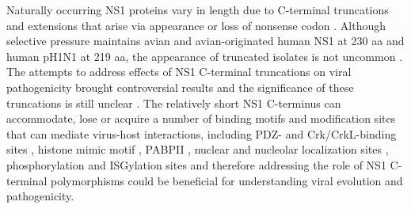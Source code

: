 		Naturally occurring \gls{NS1} proteins vary in length due to C-terminal truncations and extensions that arise via appearance or loss of nonsense codon \parencite{Parvin1983}. Although selective pressure maintains avian and avian-originated human \gls{NS1} at 230 aa and human pH1N1 at 219 aa, the appearance of truncated isolates is not uncommon \parencite{Suarez1998, Lakspere2014}. The attempts to address effects of   \gls{NS1} C-terminal truncations on viral pathogenicity brought controversial results and the significance of these truncations is still unclear \parencite{Hale2010e, Tu2011a}. The relatively short NS1 C-terminus can accommodate, lose or acquire a number of binding motifs and modification sites that can mediate virus-host interactions, including PDZ- and Crk/CrkL-binding sites \parencite{Heikkinen2008, Liu2010}, histone mimic motif \parencite{Marazzi2012}, \gls{PABP}II  \parencite{Li2001a}, nuclear and nucleolar localization sites \parencite{Melen2012}, phosphorylation \parencite{Hsiang2012} and \gls{ISG}ylation sites \parencite{Hsiang2009} and therefore addressing the role of NS1 C-terminal polymorphisms could be beneficial for understanding viral evolution and pathogenicity.
		
		
		
		
		
		
		
				
		
		
		
